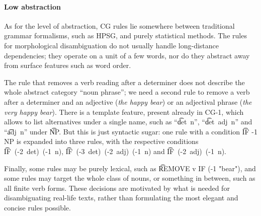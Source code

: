 




\paragraph{Low abstraction} 

As for the level of abstraction, CG rules lie somewhere between 
traditional grammar formalisms, such as HPSG, and purely statistical methods.
The rules for morphological disambiguation do not usually handle long-distance dependencies; 
they operate on a unit of a few words, nor do they abstract away from surface features such as word order.

The rule that removes a verb reading after a determiner
does not describe the whole abstract category ``noun phrase''; 
we need a second rule to remove a verb after a determiner and an adjective 
(\emph{the happy bear})  or an adjectival phrase (\emph{the very happy bear}).
There is a template feature, present already in CG-1, which allows to list alternatives under a single name, such as ``\t{det~n}'', ``\t{det~adj~n}'' and ``\t{adj~n}'' under \t{NP}. But this is just syntactic sugar: one rule with a condition \t{IF -1 NP} is expanded into three rules, with the respective conditions \t{IF~(-2~det)~(-1~n)}, \t{IF~(-3~det)~(-2~adj)~(-1~n)} and \t{IF~(-2~adj)~(-1~n)}.

Finally, some rules may be purely lexical, such as \t{REMOVE v IF (-1 "bear")}, and some rules may target the whole class of nouns, or something in between, such as all finite verb forms. These decisions are motivated by what is needed for disambiguating real-life texts, rather than formulating the most elegant and concise rules possible.




